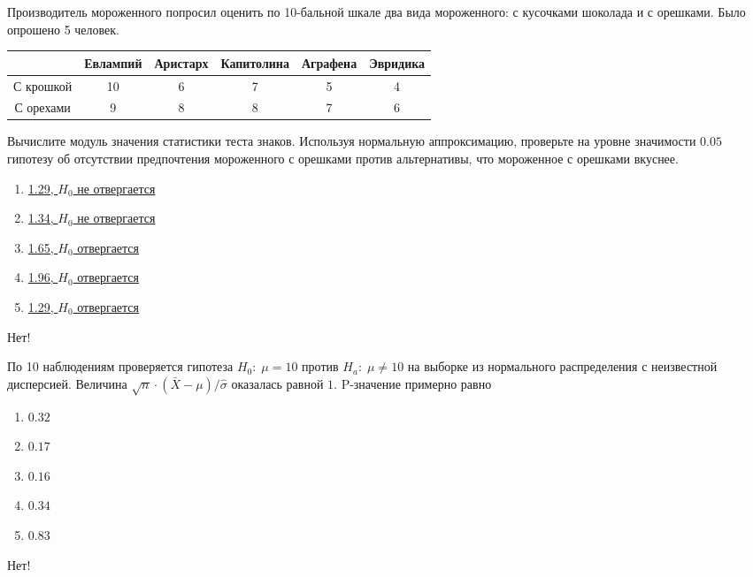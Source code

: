\documentclass[t]{beamer}
\begin{document}
 \begin{frame} \label{62-No} 
\begin{block}{62} 

 Производитель мороженного попросил оценить по 10-бальной шкале два вида мороженного: с кусочками шоколада и с орешками. Было опрошено 5 человек.


 \begin{tabular}{c|ccccc}
  & Евлампий & Аристарх & Капитолина & Аграфена & Эвридика \\
 \hline
С крошкой & 10 & 6 & 7 & 5 & 4 \\
С орехами & 9 & 8 & 8 & 7 & 6 \\
 \end{tabular}


Вычислите модуль значения статистики теста знаков. Используя нормальную аппроксимацию, проверьте на уровне значимости $0.05$ гипотезу об отсутствии предпочтения мороженного с орешками против альтернативы, что мороженное с орешками вкуснее.
 


 \end{block} 
\begin{enumerate} 
\item[] \hyperlink{62-No}{\beamergotobutton{} 1.29, $H_0$ не отвергается}
\item[] \hyperlink{62-No}{\beamergotobutton{} 1.34, $H_0$ не отвергается}
\item[] \hyperlink{62-No}{\beamergotobutton{} 1.65, $H_0$ отвергается}
\item[] \hyperlink{62-Yes}{\beamergotobutton{} 1.96, $H_0$ отвергается}
\item[] \hyperlink{62-No}{\beamergotobutton{} 1.29, $H_0$ отвергается}
\end{enumerate} 

 \alert{Нет!} 
\end{frame} 


 \begin{frame} \label{63-No} 
\begin{block}{63} 

По 10 наблюдениям проверяется гипотеза $H_0: \; \mu=10$ против $H_a: \; \mu \neq 10$ на выборке из нормального распределения с неизвестной дисперсией. Величина $\sqrt{n}\cdot (\bar{X}-\mu)/\hat{\sigma}$ оказалась равной $1$. P-значение примерно равно
 


 \end{block} 
\begin{enumerate} 
\item[] \hyperlink{63-No}{\beamergotobutton{} $0.32$}
\item[] \hyperlink{63-No}{\beamergotobutton{} $0.17$}
\item[] \hyperlink{63-Yes}{\beamergotobutton{} $0.16$}
\item[] \hyperlink{63-No}{\beamergotobutton{} $0.34$}
\item[] \hyperlink{63-No}{\beamergotobutton{} $0.83$}
\end{enumerate} 

 \alert{Нет!} 
\end{frame} 
\end{document}
